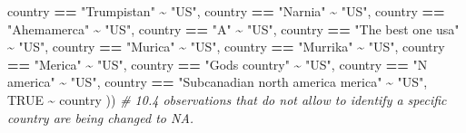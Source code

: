 \documentclass[
]{article}
\newenvironment{Shaded}{\begin{snugshade}}{\end{snugshade}}
\newcommand{\CommentTok}[1]{\textcolor[rgb]{0.56,0.35,0.01}{\textit{#1}}}
\newcommand{\ConstantTok}[1]{\textcolor[rgb]{0.56,0.35,0.01}{#1}}
\newcommand{\NormalTok}[1]{#1}
\newcommand{\SpecialCharTok}[1]{\textcolor[rgb]{0.81,0.36,0.00}{\textbf{#1}}}
\newcommand{\StringTok}[1]{\textcolor[rgb]{0.31,0.60,0.02}{#1}}
\begin{document}
\begin{Shaded}
\begin{Highlighting}[]
\NormalTok{            country }\SpecialCharTok{==} \StringTok{"Trumpistan"} \SpecialCharTok{\textasciitilde{}} \StringTok{"US"}\NormalTok{,}
\NormalTok{            country }\SpecialCharTok{==} \StringTok{"Narnia"} \SpecialCharTok{\textasciitilde{}} \StringTok{"US"}\NormalTok{,}
\NormalTok{            country }\SpecialCharTok{==} \StringTok{"Ahemamerca"} \SpecialCharTok{\textasciitilde{}} \StringTok{"US"}\NormalTok{,}
\NormalTok{            country }\SpecialCharTok{==} \StringTok{"A"} \SpecialCharTok{\textasciitilde{}} \StringTok{"US"}\NormalTok{,}
\NormalTok{            country }\SpecialCharTok{==} \StringTok{"The best one  usa"} \SpecialCharTok{\textasciitilde{}} \StringTok{"US"}\NormalTok{,}
\NormalTok{            country }\SpecialCharTok{==} \StringTok{"Murica"} \SpecialCharTok{\textasciitilde{}} \StringTok{"US"}\NormalTok{,  }
\NormalTok{            country }\SpecialCharTok{==} \StringTok{"Murrika"} \SpecialCharTok{\textasciitilde{}} \StringTok{"US"}\NormalTok{,}
\NormalTok{            country }\SpecialCharTok{==} \StringTok{"Merica"} \SpecialCharTok{\textasciitilde{}} \StringTok{"US"}\NormalTok{,}
\NormalTok{            country }\SpecialCharTok{==} \StringTok{"Gods country"} \SpecialCharTok{\textasciitilde{}} \StringTok{"US"}\NormalTok{,}
\NormalTok{            country }\SpecialCharTok{==} \StringTok{"N america"} \SpecialCharTok{\textasciitilde{}} \StringTok{"US"}\NormalTok{,}
\NormalTok{            country }\SpecialCharTok{==} \StringTok{"Subcanadian north america merica"} \SpecialCharTok{\textasciitilde{}} \StringTok{"US"}\NormalTok{,}
            \ConstantTok{TRUE}     \SpecialCharTok{\textasciitilde{}}\NormalTok{ country}
\NormalTok{))}
\CommentTok{\# 10.4 observations that do not allow to identify a specific country are being changed to \textquotesingle{}NA\textquotesingle{}.}



\end{Highlighting}
\end{Shaded}
\end{document}
